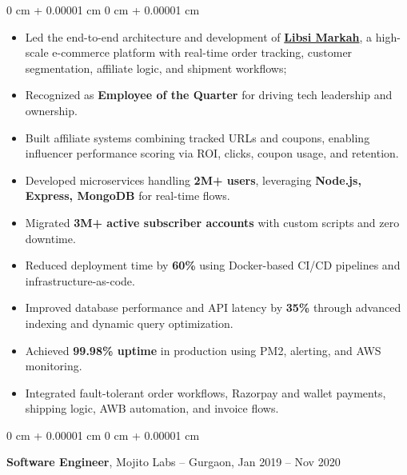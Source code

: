 \documentclass[10pt, letterpaper]{article}
\newenvironment{highlights}{
    \begin{itemize}[
        topsep=0.10 cm,
        parsep=0.10 cm,
        partopsep=0pt,
        itemsep=0pt,
        leftmargin=0 cm + 10pt
    ]
}{
    \end{itemize}
} %
\newenvironment{onecolentry}{
    \begin{adjustwidth}{
        0 cm + 0.00001 cm
    }{
        0 cm + 0.00001 cm
    }
}{
    \end{adjustwidth}
} %
\newenvironment{twocolentry}[2][]{
    \onecolentry
    \def\secondColumn{#2}
    \setcolumnwidth{\fill, 4.5 cm}
    \begin{paracol}{2}
}{
    \switchcolumn \raggedleft \secondColumn
    \end{paracol}
    \endonecolentry
} %
\begin{document}
        \vspace{0.10 cm}
        \begin{onecolentry}
            \begin{highlights}
                \item Led the end-to-end architecture and development of \href{https://libsimarkah.com/}{\textbf{Libsi Markah}}, a high-scale e-commerce platform with real-time order tracking, customer segmentation, affiliate logic, and shipment workflows;
                \item Recognized as \textbf{Employee of the Quarter} for driving tech leadership and ownership.
                \item Built affiliate systems combining tracked URLs and coupons, enabling influencer performance scoring via ROI, clicks, coupon usage, and retention.
                \item Developed microservices handling \textbf{2M+ users}, leveraging \textbf{Node.js, Express, MongoDB} for real-time flows.
                \item Migrated \textbf{3M+ active subscriber accounts} with custom scripts and zero downtime.
                \item Reduced deployment time by \textbf{60\%} using Docker-based CI/CD pipelines and infrastructure-as-code.
                \item Improved database performance and API latency by \textbf{35\%} through advanced indexing and dynamic query optimization.
                \item Achieved \textbf{99.98\% uptime} in production using PM2, alerting, and AWS monitoring.
                \item Integrated fault-tolerant order workflows, Razorpay and wallet payments, shipping logic, AWB automation, and invoice flows.


            \end{highlights}
        \end{onecolentry}


        \vspace{0.2 cm}

        \begin{twocolentry}{
            Jan 2019 – Nov 2020
        }
            \textbf{Software Engineer}, Mojito Labs -- Gurgaon, \end{twocolentry}
\end{document}
